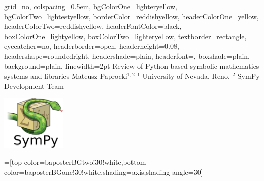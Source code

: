 \documentclass[portrait]{baposter}
\begin{document}
\begin{poster}{
  grid=no,
  colspacing=0.5em,
  bgColorOne=lighteryellow,
  bgColorTwo=lightestyellow,
  borderColor=reddishyellow,
  headerColorOne=yellow,
  headerColorTwo=reddishyellow,
  headerFontColor=black,
  boxColorOne=lightyellow,
  boxColorTwo=lighteryellow,
  textborder=rectangle,
  eyecatcher=no,
  headerborder=open,
  headerheight=0.08\textheight,
  headershape=roundedright,
  headershade=plain,
  headerfont=\large\textsf, %
  boxshade=plain,
  background=plain,
  linewidth=2pt
  }
  {} %
  {\sf %
  Review of Python-based symbolic mathematics systems and libraries}
  {\sf %
  Mateusz Paprocki$^{1,2}$
  \hspace{3em}
  $^1$ University of Nevada, Reno,
  $^2$ SymPy Development Team
  }
  {{\begin{minipage}{12em}
    \hfill
    \includegraphics[height=7.0em]{sympy-logo}
  \end{minipage}}
  }

  =[top color=baposterBGtwo!30!white,bottom color=baposterBGone!30!white,shading=axis,shading angle=30]

     \newlength{\leftimgwidth}
     \setlength{\leftimgwidth}{0.78em+8.0em}



\end{poster}
\end{document}
